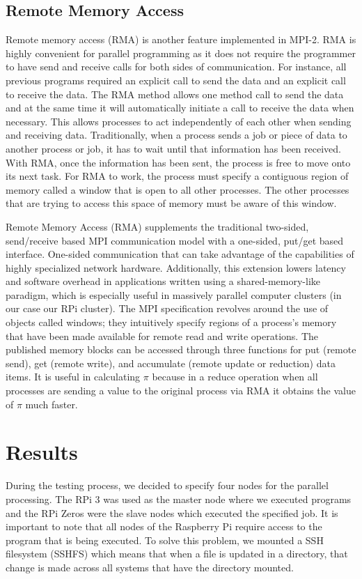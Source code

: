 \subsection {Remote Memory Access}
Remote memory access (RMA) is another feature implemented in MPI-2. RMA is highly convenient for parallel programming as it does not require the programmer to have send and receive calls for both sides of communication. For instance, all previous programs required an explicit call to send the data and an explicit call to receive the data. The RMA method allows one method call to send the data and at the same time it will automatically initiate a call to receive the data when necessary. This allows processes to act independently of each other when sending and receiving data. Traditionally, when a process sends a job or piece of data to another process or job, it has to wait until that information has been received. With RMA, once the information has been sent, the process is free to move onto its next task. For RMA to work, the process must specify a contiguous region of memory called a window that is open to all other processes. The other processes that are trying to access this space of memory must be aware of this window.

	Remote Memory Access (RMA) supplements the traditional two-sided, send/receive based MPI communication model with a one-sided, put/get based interface. One-sided communication that can take advantage of the capabilities of highly specialized network hardware. Additionally, this extension lowers latency and software overhead in applications written using a shared-memory-like paradigm, which is especially useful in massively parallel computer clusters (in our case our RPi cluster). The MPI specification revolves around the use of objects called windows; they intuitively specify regions of a process’s memory that have been made available for remote read and write operations. The published memory blocks can be accessed through three functions for put (remote send), get (remote write), and accumulate (remote update or reduction) data items. It is useful in calculating $\pi$ because in a reduce operation when all processes are sending a value to the original process via RMA it obtains the value of $\pi$ much faster.

\section{Results}
During the testing process, we decided to specify four nodes for the parallel processing. The RPi 3 was used as the master node where we executed programs and the RPi Zeros were the slave nodes which executed the specified job. It is important to note that all nodes of the Raspberry Pi require access to the program that is being executed. To solve this problem, we mounted a SSH filesystem (SSHFS) which means that when a file is updated in a directory, that change is made across all systems that have the directory mounted. 

